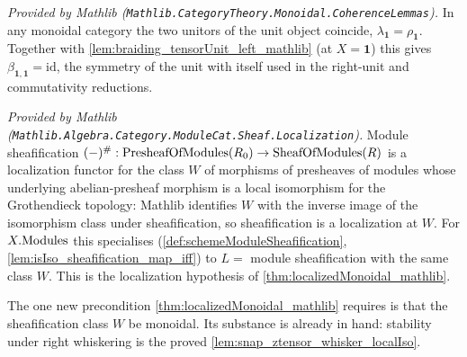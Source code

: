 \begin{lemma}
  \label{lem:unitors_equal_mathlib}
  \mathlibok
  \textit{Provided by Mathlib
  (\texttt{Mathlib.CategoryTheory.Monoidal.CoherenceLemmas}).}
  In any monoidal category the two unitors of the unit object coincide,
  \(\lambda_{\mathbf{1}} = \rho_{\mathbf{1}}\). Together with
  \cref{lem:braiding_tensorUnit_left_mathlib} (at \(X = \mathbf{1}\)) this gives
  \(\beta_{\mathbf{1},\mathbf{1}} = \mathrm{id}\), the symmetry of the unit with
  itself used in the right-unit and commutativity reductions.
\end{lemma}

\begin{lemma}
  \label{lem:sheafification_isLocalization_mathlib}
  \mathlibok
  \textit{Provided by Mathlib
  (\texttt{Mathlib.Algebra.Category.ModuleCat.Sheaf.Localization}).}
  Module sheafification \((-)^{\#} : \mathrm{PresheafOfModules}(R_0) \to \mathrm{SheafOfModules}(R)\) is a
  localization functor for the class \(W\) of morphisms of presheaves of modules
  whose underlying abelian-presheaf morphism is a local isomorphism for the
  Grothendieck topology: Mathlib identifies \(W\) with the inverse image of the
  isomorphism class under sheafification, so sheafification is a localization at
  \(W\). For \(X.\mathrm{Modules}\) this specialises (\cref{def:schemeModuleSheafification},
  \cref{lem:isIso_sheafification_map_iff}) to \(L = \) module sheafification with
  the same class \(W\). This is the localization hypothesis of
  \cref{thm:localizedMonoidal_mathlib}.
\end{lemma}

The one new precondition \cref{thm:localizedMonoidal_mathlib} requires is that the
sheafification class \(W\) be monoidal. Its substance is already in hand: stability
under right whiskering is the proved \cref{lem:snap_ztensor_whisker_localIso}.

